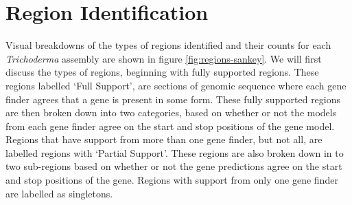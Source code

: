 \section{Region Identification}

Visual breakdowns of the types of regions identified and their counts
for each \textit{Trichoderma} assembly are shown in figure
\ref{fig:regions-sankey}. We will first discuss the types of regions,
beginning with fully supported regions. These regions labelled `Full
Support', are sections of genomic sequence where each gene finder
agrees that a gene is present in some form. These fully supported
regions are then broken down into two categories, based on whether or
not the models from each gene finder agree on the start and stop
positions of the gene model. Regions that have support from more than
one gene finder, but not all, are labelled regions with `Partial
Support'. These regions are also broken down in to two sub-regions
based on whether or not the gene predictions agree on the start and
stop positions of the gene. Regions with support from only one gene
finder are labelled as singletons.

